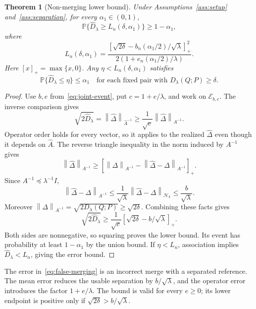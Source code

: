 \documentclass[11pt,a4paper]{article}
\newtheorem{theorem}{Theorem}[section]
\theoremstyle{definition}
\theoremstyle{remark}
\newcommand{\HH}{\mathcal H_k}
\newcommand{\Prob}{\mathbb P}
\newcommand{\norm}[1]{\left\lVert#1\right\rVert}
\newcommand{\D}{D_\lambda(Q;P)}
\newcommand{\Dh}{\widehat D_\lambda}
\newcommand{\pos}[1]{\left[#1\right]_+}
\begin{document}
\begin{theorem}[Non-merging lower bound]\label{thm:alternative}
Under Assumptions~\ref{ass:setup} and~\ref{ass:separation}, for every
$\alpha_1\in(0,1)$,
\begin{equation}\label{eq:alternative}
 \Prob\{\Dh\ge L_n(\delta,\alpha_1)\}\ge1-\alpha_1,
\end{equation}
where
\begin{equation}\label{eq:L}
 \boxed{L_n(\delta,\alpha_1)=
 \frac{\pos{\sqrt{2\delta}-b_n(\alpha_1/2)/\sqrt\lambda}^{2}}
 {2\left(1+e_n(\alpha_1/2)/\lambda\right)}.}
\end{equation}
Here $[x]_+=\max\{x,0\}$. Any $\eta<L_n(\delta,\alpha_1)$ satisfies
\begin{equation}\label{eq:false-merging}
 \Prob\{\Dh\le\eta\}\le\alpha_1
 \quad\text{for each fixed pair with }\D\ge\delta.
\end{equation}
\end{theorem}
\begin{proof}
Use $b,e$ from~\eqref{eq:joint-event}, put $c=1+e/\lambda$, and work
on $\mathcal E_{b,e}$. The inverse comparison gives
\begin{equation}\label{eq:weighted-comparison}
 \sqrt{2\Dh}=\norm{\widehat\Delta}_{\widehat A^{-1}}
 \ge\frac1{\sqrt c}\norm{\widehat\Delta}_{A^{-1}}.
\end{equation}
Operator order holds for every vector, so it applies to the realized
$\widehat\Delta$ even though it depends on $\widehat A$.
The reverse triangle inequality in the norm induced by $A^{-1}$ gives
\[
 \norm{\widehat\Delta}_{A^{-1}}
 \ge\pos{\norm{\Delta}_{A^{-1}}
                 -\norm{\widehat\Delta-\Delta}_{A^{-1}}}.
\]
Since $A^{-1}\preceq\lambda^{-1}I$,
\[
 \norm{\widehat\Delta-\Delta}_{A^{-1}}
 \le\frac1{\sqrt\lambda}\norm{\widehat\Delta-\Delta}_{\HH}
 \le\frac b{\sqrt\lambda}.
\]
Moreover $\norm{\Delta}_{A^{-1}}=\sqrt{2\D}\ge\sqrt{2\delta}$.
Combining these facts gives
\[
 \sqrt{2\Dh}\ge\frac1{\sqrt c}
                  \pos{\sqrt{2\delta}-b/\sqrt\lambda}.
\]
Both sides are nonnegative, so squaring proves the lower bound.
Its event has probability at least $1-\alpha_1$ by the union bound.
If $\eta<L_n$, association implies $\Dh<L_n$, giving the error bound.
\end{proof}
The error in~\eqref{eq:false-merging} is an incorrect merge with a
separated reference. The mean error reduces the usable separation by
$b/\sqrt\lambda$, and the operator error introduces the factor
$1+e/\lambda$. The bound is valid for every $e\ge0$; its lower
endpoint is positive only if $\sqrt{2\delta}>b/\sqrt\lambda$.
\end{document}
